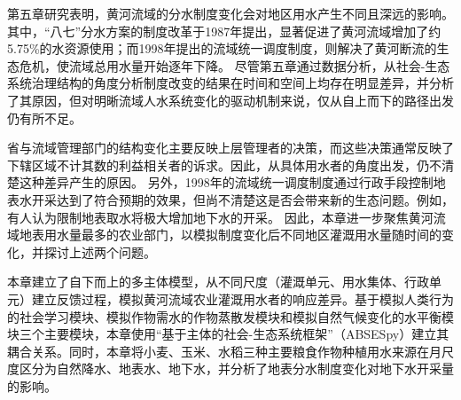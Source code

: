 第五章研究表明，黄河流域的分水制度变化会对地区用水产生不同且深远的影响。
其中，“八七”分水方案的制度改革于1987年提出，显著促进了黄河流域增加了约5.75\%的水资源使用；而1998年提出的流域统一调度制度，则解决了黄河断流的生态危机，使流域总用水量开始逐年下降。
尽管第五章通过数据分析，从社会-生态系统治理结构的角度分析制度改变的结果在时间和空间上均存在明显差异，并分析了其原因，但对明晰流域人水系统变化的驱动机制来说，仅从自上而下的路径出发仍有所不足。

省与流域管理部门的结构变化主要反映上层管理者的决策，而这些决策通常反映了下辖区域不计其数的利益相关者的诉求。因此，从具体用水者的角度出发，仍不清楚这种差异产生的原因。
另外，1998年的流域统一调度制度通过行政手段控制地表水开采达到了符合预期的效果，但尚不清楚这是否会带来新的生态问题。例如，有人认为限制地表取水将极大增加地下水的开采。
因此，本章进一步聚焦黄河流域地表用水量最多的农业部门，以模拟制度变化后不同地区灌溉用水量随时间的变化，并探讨上述两个问题。

本章建立了自下而上的多主体模型，从不同尺度（灌溉单元、用水集体、行政单元）建立反馈过程，模拟黄河流域农业灌溉用水者的响应差异。基于模拟人类行为的社会学习模块、模拟作物需水的作物蒸散发模块和模拟自然气候变化的水平衡模块三个主要模块，本章使用“基于主体的社会-生态系统框架”（ABSESpy）建立其耦合关系。同时，本章将小麦、玉米、水稻三种主要粮食作物种植用水来源在月尺度区分为自然降水、地表水、地下水，并分析了地表分水制度变化对地下水开采量的影响。

